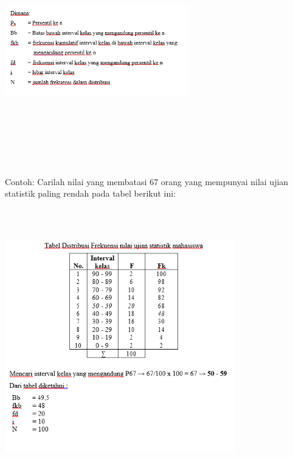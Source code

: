 \documentclass[11pt,fleqn]{book} %
\begin{document}
{\includegraphics[width = 8cm, height= 10cm]{Pictures/rizkie8.png}

Contoh:
Carilah nilai yang membatasi 67 orang yang mempunyai nilai ujian statistik paling rendah pada tabel berikut ini:

\includegraphics[width = 10cm, height= 12cm]{Pictures/rizkie9.png}

}
\end{document}
